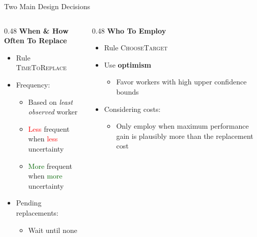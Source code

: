\documentclass[10pt,aspectratio=169]{beamer}
\begin{document}
\begin{frame}[t]{Two Main Design Decisions}
\begin{columns}[t]
    \begin{column}{0.48\textwidth}
        \centering
        \textbf{When \& How Often To Replace}
        \vspace{0.5em}
        \raggedright
        \begin{itemize}
            \item Rule \textsc{TimeToReplace}
            \item Frequency:
                \begin{itemize}
                    \item Based on \emph{least observed} worker
                    \item \textcolor{red}{Less} frequent when \textcolor{red}{less} uncertainty
                    \item \textcolor{darkgreen}{More} frequent when \textcolor{darkgreen}{more} uncertainty
                \end{itemize}
            \item Pending replacements: 
                \begin{itemize}
                    \item Wait until none
                \end{itemize}
        \end{itemize}
    \end{column}

    \begin{column}{0.48\textwidth}
        \centering
        \textbf{Who To Employ}

        \vspace{0.5em}
        \raggedright
        \begin{itemize}
            \item Rule \textsc{ChooseTarget}
            \item Use {\bf optimism}
            \begin{itemize}
                \item Favor workers with high upper confidence bounds
            \end{itemize}
            \item Considering costs:
            \begin{itemize}
                \item Only employ when maximum performance gain is plausibly more than the replacement cost
            \end{itemize}
        \end{itemize}
    \end{column}
\end{columns}
\end{frame}
\end{document}
